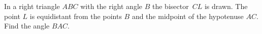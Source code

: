 \problem
In a right triangle $ABC$ with the right angle $B$ the bisector~$CL$ is drawn.
The point $L$ is equidistant from the points $B$ and the midpoint of
the hypotenuse $AC$.
Find the angle $BAC$.
\solution
\endproblem
